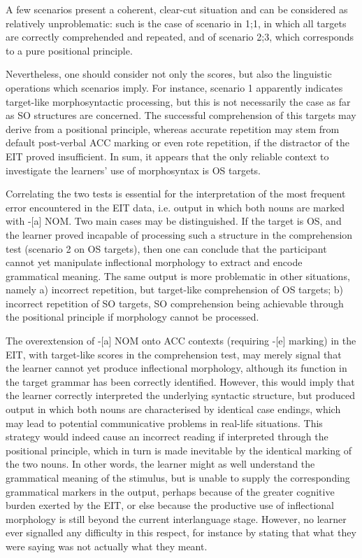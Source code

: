 A few scenarios present a coherent, clear-cut situation and can be considered as relatively unproblematic: such is the case of scenario in 1;1, in which all targets are correctly comprehended and repeated, and of scenario 2;3, which corresponds to a pure positional principle. 

Nevertheless, one should consider not only the scores, but also the linguistic operations which scenarios imply. For instance, scenario 1 apparently indicates target-like morphosyntactic processing, but this is not necessarily the case as far as SO structures are concerned. The successful comprehension of this targets may derive from a positional principle, whereas accurate repetition may stem from default post-verbal ACC marking or even rote repetition, if the distractor of the EIT proved insufficient. In sum, it appears that the only reliable context to investigate the learners’ use of morphosyntax is OS targets.

Correlating the two tests is essential for the interpretation of the most frequent error encountered in the EIT data, i.e. output in which both nouns are marked with -[a] NOM. Two main cases may be distinguished. If the target is OS, and the learner proved incapable of processing such a structure in the comprehension test (scenario 2 on OS targets), then one can conclude that the participant cannot yet manipulate inflectional morphology to extract and encode grammatical meaning. The same output is more problematic in other situations, namely a) incorrect repetition, but target-like comprehension of OS targets; b) incorrect repetition of SO targets, SO comprehension being achievable through the positional principle if morphology cannot be processed.

The overextension of -[a] NOM onto ACC contexts (requiring -[e] marking) in the EIT, with target-like scores in the comprehension test, may merely signal that the learner cannot yet produce inflectional morphology, although its function in the target grammar has been correctly identified. However, this would imply that the learner correctly interpreted the underlying syntactic structure, but produced output in which both nouns are characterised by identical case endings, which may lead to potential communicative problems in real-life situations. This strategy would indeed cause an incorrect reading if interpreted through the positional principle, which in turn is made inevitable by the identical marking of the two nouns. In other words, the learner might as well understand the grammatical meaning of the stimulus, but is unable to supply the corresponding grammatical markers in the output, perhaps because of the greater cognitive burden exerted by the EIT, or else because the productive use of inflectional morphology is still beyond the current interlanguage stage. However, no learner ever signalled any difficulty in this respect, for instance by stating that what they were saying was not actually what they meant.

